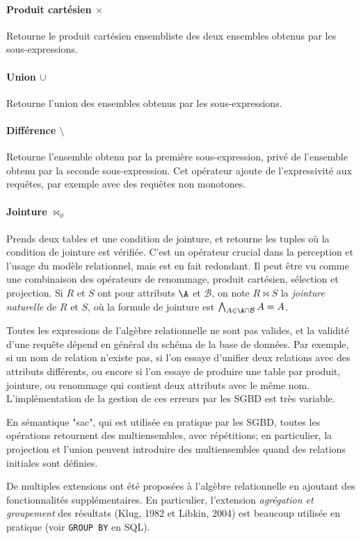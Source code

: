 \documentclass[french, toc]{../cs-classes/cs-classes}
\begin{document}
\paragraph*{Produit cartésien $\times$}
Retourne le produit cartésien ensembliste des deux ensembles obtenus par les sous-expressions.
\paragraph*{Union $\cup$}
Retourne l'union des ensembles obtenus par les sous-expressions.
\paragraph*{Différence $\setminus$}
Retourne l'ensemble obtenu par la première sous-expression, privé de l'ensemble obtenu par la seconde sous-expression. Cet opérateur ajoute de l'expressivité aux requêtes, par exemple avec des requêtes non monotones.
\paragraph*{Jointure $\bowtie_\phi$}
Prends deux tables et une condition de jointure, et retourne les tuples où la condition de jointure est vérifiée. C'est un opérateur crucial dans la perception et l'usage du modèle relationnel, mais est en fait redondant. Il peut être vu comme une combinaison des opérateurs de renommage, produit cartésien, sélection et projection.
Si $R$ et $S$ ont pour attributs $\A$ et $\mathcal{B}$, on note $R\bowtie S$ la \emph{jointure naturelle} de $R$ et $S$, où la formule de jointure est $\bigwedge_{A\in\A\cap \mathcal{B}}A=A$.

Toutes les expressions de l'algèbre relationnelle ne sont pas valides, et la validité d'une requête dépend en général du schéma de la base de données. Par exemple, si un nom de relation n'existe pas, si l'on essaye d'unifier deux relations avec des attributs différents, ou encore si l'on essaye de produire une table par produit, jointure, ou renommage qui contient deux attributs avec le même nom. L'implémentation de la gestion de ces erreurs par les SGBD est très variable.

En sémantique "sac", qui est utilisée en pratique par les SGBD, toutes les opérations retournent des multiensembles, avec répétitions; en particulier, la projection et l'union peuvent introduire des multiensembles quand des relations initiales sont définies.

De multiples extensions ont été proposées à l'algèbre relationnelle en ajoutant des fonctionnalités supplémentaires. En particulier, l'extension \emph{agrégation et groupement} des résultats (Klug, 1982 et Libkin, 2004) est beaucoup utilisée en pratique (voir \texttt{GROUP BY} en SQL).
\end{document}
